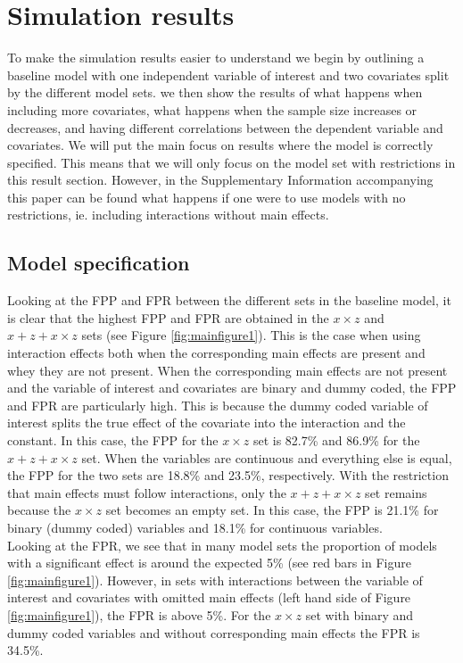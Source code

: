 \section{Simulation results} 
To make the simulation results easier to understand we begin by outlining a baseline model with one independent variable of interest and two covariates split by the different model sets. we then show the results of what happens when including more covariates, what happens when the sample size increases or decreases, and having different correlations between the dependent variable and covariates. We will put the main focus on results where the model is correctly specified. This means that we will only focus on the model set with restrictions in this result section. However, in the Supplementary Information accompanying this paper can be found what happens if one were to use models with no restrictions, ie. including interactions without main effects. 

\subsection{Model specification}
Looking at the FPP and FPR between the different sets in the baseline model, it is clear that the highest FPP and FPR are obtained in the $x \times z$ and $x + z+ x \times z$ sets (see Figure \ref{fig:mainfigure1}). This is the case when using interaction effects both when the corresponding main effects are present and whey they are not present. When the corresponding main effects are not present and the variable of interest and covariates are binary and dummy coded, the FPP and FPR are particularly high. This is because the dummy coded variable of interest splits the true effect of the covariate into the interaction and the constant. In this case, the FPP for the $x \times z$ set is 82.7\% and 86.9\% for the $x + z+ x \times z$ set. When the variables are continuous and everything else is equal, the FPP for the two sets are 18.8\% and 23.5\%, respectively. With the restriction that main effects must follow interactions, only the $x + z+ x \times z$ set remains because the $x \times z$ set becomes an empty set. In this case, the FPP is 21.1\% for binary (dummy coded) variables and 18.1\% for continuous variables. \\ 
Looking at the FPR, we see that in many model sets the proportion of models with a significant effect is around the expected 5\%  (see red bars in Figure \ref{fig:mainfigure1}). However, in sets with interactions between the variable of interest and covariates with omitted main effects (left hand side of Figure \ref{fig:mainfigure1}), the FPR is above 5\%. For the $x \times z$ set with binary and dummy coded variables and without corresponding main effects the FPR is 34.5\%.
 \\

